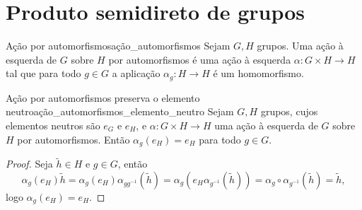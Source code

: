 \section{Produto semidireto de grupos}
\begin{definition}{Ação por automorfismos}{ação_automorfismos}
    Sejam \(G, H\) grupos. Uma ação à esquerda de \(G\) sobre \(H\) por automorfismos é uma ação à esquerda \(\alpha : G \times H \to H\) tal que para todo \(g \in G\) a aplicação \(\alpha_{g} : H \to H\) é um homomorfismo.
\end{definition}

\begin{lemma}{Ação por automorfismos preserva o elemento neutro}{ação_automorfismos_elemento_neutro}
    Sejam \(G, H\) grupos, cujos elementos neutros são \(e_G\) e \(e_H\), e \(\alpha : G \times H \to H\) uma ação à esquerda de \(G\) sobre \(H\) por automorfismos. Então \(\alpha_{g}(e_H) = e_H\) para todo \(g \in G\).
\end{lemma}
\begin{proof}
    Seja \(\tilde{h} \in H\) e \(g \in G\), então
    \begin{equation*}
        \alpha_g(e_H)\tilde{h} = \alpha_{g}(e_H) \alpha_{g g^{-1}}(\tilde{h}) = \alpha_{g}\left(e_H\alpha_{g^{-1}}(\tilde{h})\right) = \alpha_{g} \circ \alpha_{g^{-1}}(\tilde{h}) = \tilde{h},
    \end{equation*}
    logo \(\alpha_{g}(e_H) = e_H\).
\end{proof}

